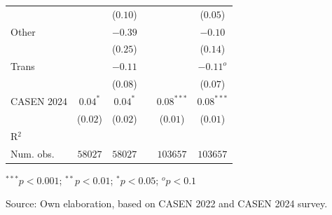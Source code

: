 \begin{table}[H]
\begin{center}
\begin{threeparttable}
\begin{tabular}{lccccc}
 & & ($0.10$) & & & ($0.05$) \\ 
Other & & $-0.39$ & & & $-0.10$ \\ 
 & & ($0.25$) & & & ($0.14$) \\ 
Trans & & $-0.11$ & & & $-0.11^{o}$ \\ 
 & & ($0.08$) & & & ($0.07$) \\ 
CASEN 2024 & $0.04^{*}$& $0.04^{*}$ & & $0.08^{***}$& $0.08^{***}$ \\ 
 & ($0.02$)& ($0.02$) & & ($0.01$)& ($0.01$) \\ 
R$^2$ & &  & & &  \\ 
Num. obs. & $58027$& $58027$ & & $103657$& $103657$ \\ \bottomrule
\end{tabular}
\begin{tablenotes}
\item ${}^{***}p<0.001$; ${}^{**}p<0.01$; ${}^{*}p<0.05$; ${}^{o}p<0.1$
\item Source: Own elaboration, based on CASEN 2022 and CASEN 2024 survey.
\end{tablenotes}
\end{threeparttable}
\end{center}
\end{table}